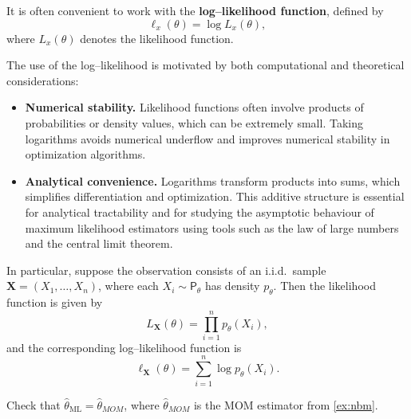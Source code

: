 \label{par:Log-likelihood}

It is often convenient to work with the \textbf{log--likelihood function},
defined by
\[
    \ell_x(\theta) = \log L_x(\theta),
\]
where \(L_x(\theta)\) denotes the likelihood function.

The use of the log--likelihood is motivated by both computational and
theoretical considerations:
\begin{itemize}
    \item \textbf{Numerical stability.} Likelihood functions often involve
    products of probabilities or density values, which can be extremely
    small. Taking logarithms avoids numerical underflow and improves
    numerical stability in optimization algorithms.

    \item \textbf{Analytical convenience.} Logarithms transform products
    into sums, which simplifies differentiation and optimization.
This additive structure is essential for analytical tractability and for studying the asymptotic behaviour of maximum likelihood estimators using tools such as the law of large numbers and the central limit theorem.
\end{itemize}

In particular, suppose the observation consists of an i.i.d.\ sample
\(\mathbf{X} = (X_1, \dots, X_n)\), where each \(X_i \sim \mathsf{P}_\theta\)
has density \(p_\theta\). Then the likelihood function is given by
\[
    L_{\mathbf{X}}(\theta)
    = \prod_{i=1}^n p_\theta(X_i),
\]
and the corresponding log--likelihood function is
\[
    \ell_{\mathbf{X}}(\theta)
    = \sum_{i=1}^n \log p_\theta(X_i).
\]

\begin{ex}
    Check that \(\hat{\theta}_{\text{ML}} = \hat{\theta}_{MOM}\), where \(\hat{\theta}_{MOM}\) is the MOM estimator from \autoref{ex:nbm}.
\end{ex}


